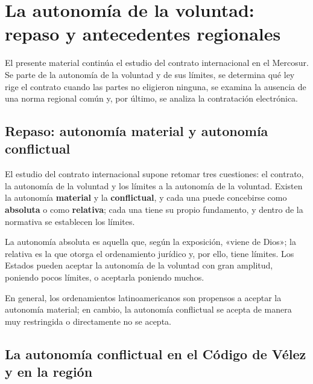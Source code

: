 \documentclass[12pt,oneside]{book}
\begin{document}
\tableofcontents


\chapter[Autonomía de la voluntad]{La autonomía de la voluntad: repaso y antecedentes regionales}

El presente material continúa el estudio del contrato internacional en el Mercosur. Se parte de la autonomía de la voluntad y de sus límites, se determina qué ley rige el contrato cuando las partes no eligieron ninguna, se examina la ausencia de una norma regional común y, por último, se analiza la contratación electrónica.

\section{Repaso: autonomía material y autonomía conflictual}

El estudio del contrato internacional supone retomar tres cuestiones: el contrato, la autonomía de la voluntad y los límites a la autonomía de la voluntad. Existen la autonomía \textbf{material} y la \textbf{conflictual}, y cada una puede concebirse como \textbf{absoluta} o como \textbf{relativa}; cada una tiene su propio fundamento, y dentro de la normativa se establecen los límites.

La autonomía absoluta es aquella que, según la exposición, «viene de Dios»; la relativa es la que otorga el ordenamiento jurídico y, por ello, tiene límites. Los Estados pueden aceptar la autonomía de la voluntad con gran amplitud, poniendo pocos límites, o aceptarla poniendo muchos.

En general, los ordenamientos latinoamericanos son propensos a aceptar la autonomía material; en cambio, la autonomía conflictual se acepta de manera muy restringida o directamente no se acepta.

\section{La autonomía conflictual en el Código de Vélez y en la región}
\end{document}
